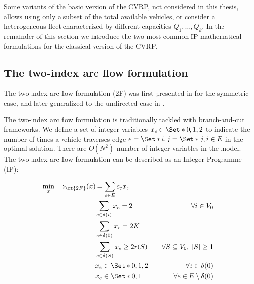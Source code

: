 \medskip

Some variants of the basic version of the CVRP, not considered in this thesis, allows using only a subset of the total available vehicles,
or consider a heterogeneous fleet characterized by different capacities $Q_1, \dots, Q_k$.
In the remainder of this section we introduce the two most common IP mathematical formulations for the classical version of the CVRP.

\subsection{The two-index arc flow formulation}
\label{sec:intro-cvrp-two-index-flow-formulation}

The two-index arc flow formulation (2F) was first presented in \cite{laporte1983, laporte1985} for the symmetric case,
and later generalized to the undirected case in \cite{laporte1986}.

The two-index arc flow formulation is traditionally tackled with branch-and-cut frameworks.
We define a set of integer variables $x_e \in \Set*{0, 1, 2}$ to indicate the number of times
a vehicle traverses edge $e = \Set*{i, j} = \Set*{j, i} \in E$ in the optimal solution.
There are $O(N^2)$ number of integer variables in the model.
The two-index arc flow formulation can be described as an Integer Programme (IP):

\begin{align}
	\min_{x} \quad z_\mt{2F}(x) & = \sum_{e \in E} c_e x_e \label{eq:two-index-flow-obj-func}                                                                                        \\
	                            & \sum_{e \in \delta(i)} x_e = 2                              & \quad \forall i \in V_0 \label{eq:two-index-flow-two-edges-incident-per-customer}    \\
	                            & \sum_{e \in \delta(0)} x_e = 2 K                            & \label{eq:two-index-flow-two-k-edges-incident-in-the-depot-node}                     \\
	                            & \sum_{e \in \delta(S)} x_e \ge 2 r(S)                       & \quad \forall S \subseteq V_0,\ |S| \ge 1 \label{eq:two-index-flow-ccc}              \\
	                            & x_e                   \in \Set*{0, 1, 2}                    & \quad \forall e \in \delta(0) \label{eq:two-index-flow-x-mip-var-bounds-depot}       \\
	                            & x_e                   \in \Set*{0, 1}                       & \quad \forall e \in E \setminus \delta(0) \label{eq:two-index-flow-x-mip-var-bounds}
\end{align}


